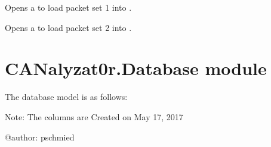 \documentclass[letterpaper,10pt,english]{sphinxmanual}
\begin{document}
\begin{fulllineitems}
\begin{fulllineitems}
\begin{quote}
\begin{description}
\end{description}\end{quote}

\end{fulllineitems}


\begin{fulllineitems}
\label{\detokenize{src:src.ComparerTab.ComparerTab.setPacketSet1}}
Opens a {\hyperref[\detokenize{src:src.PacketsDialog.PacketsDialog}]{}} to load packet set 1 into .

\end{fulllineitems}


\begin{fulllineitems}
\label{\detokenize{src:src.ComparerTab.ComparerTab.setPacketSet2}}
Opens a {\hyperref[\detokenize{src:src.PacketsDialog.PacketsDialog}]{}} to load packet set 2 into .

\end{fulllineitems}


\end{fulllineitems}



\section{CANalyzat0r.Database module}
\label{\detokenize{src:canalyzat0r-database-module}}
The database model is as follows:

Note: The  columns are 
\label{\detokenize{src:module-src.Database}}
Created on May 17, 2017

@author: pschmied
\end{document}

